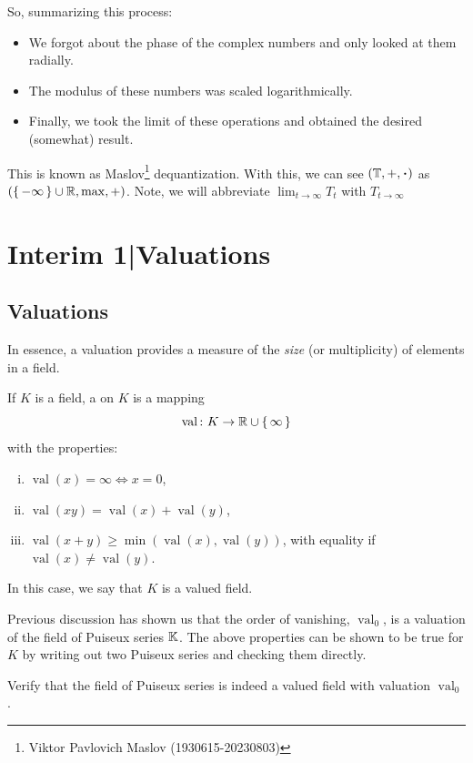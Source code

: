 \documentclass[12pt]{memoir}
\DeclareMathOperator{\val}{val}
\theoremstyle{definition}
\begin{document}
So, summarizing this process:
\begin{itemize}
    \item We forgot about the phase of the complex numbers and only looked at them radially. 
    \item The modulus of these numbers was scaled logarithmically.
    \item Finally, we took the limit of these operations and obtained the desired (somewhat) result.
\end{itemize}
This is known as Maslov\footnote{Viktor Pavlovich Maslov (1930615-20230803)} dequantization. With this, we can see $(\bT,+,\.)$ as $(\{\,-\infty\,\}\cup\mathbb{R},\max,+)$. Note, we will abbreviate $\lim_{t\to\infty}T_t$ with $T_{t\to\infty}$

\section{Interim 1|Valuations}

\subsection{Valuations}

In essence, a valuation provides a measure of the \emph{size} (or multiplicity) of elements in a field. 

\begin{Def}
    If $K$ is a field, a  on $K$ is a mapping
    $$\val\:\ K\to\bR\cup\set{\infty}$$
    with the properties:
    \begin{enumerate}[i)]
        \itemsep=-0.4em 
        \item $\val(x)=\infty\iff x=0$,
        \item $\val(xy)=\val(x)+\val(y)$,
        \item $\val(x+y)\geq\min(\val(x),\val(y))$, with equality if $\val(x)\neq\val(y)$.
    \end{enumerate}
    In this case, we say that $K$ is a valued field.
\end{Def}

Previous discussion has shown us that the order of vanishing, $\val_0$, is a valuation of the field of Puiseux series $\mathbb{K}$. The above properties can be shown to be true for $K$ by writing out two Puiseux series and checking them directly.

\begin{Ej}
Verify that the field of Puiseux series is indeed a valued field with valuation $\val_0$.
\end{Ej}
\end{document}
